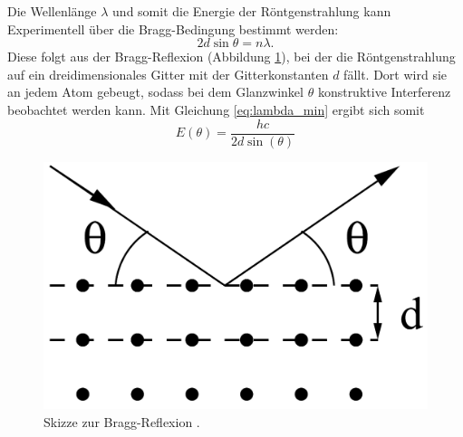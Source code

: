 \noindent Die Wellenlänge $\lambda$ und somit die Energie der Röntgenstrahlung kann Experimentell über die Bragg-Bedingung bestimmt werden:
\begin{equation}
2d\sin\theta = n\lambda\text{.}\label{eq:Bragg}
\end{equation}
Diese folgt aus der Bragg-Reflexion (Abbildung \ref{fig:Bragg}), bei der die Röntgenstrahlung auf ein dreidimensionales Gitter mit der Gitterkonstanten $d$ fällt. Dort wird sie an jedem Atom gebeugt, sodass bei dem Glanzwinkel $\theta$ konstruktive Interferenz beobachtet werden kann.
Mit Gleichung \ref{eq:lambda_min} ergibt sich somit
\begin{equation}
E(\theta)=\frac{hc}{2d\sin{(\theta)}}\label{eq:E}
\end{equation}
\begin{figure}
\centering
\includegraphics[scale=0.2]{content/images/BraggReflexion.png}
\caption{Skizze zur Bragg-Reflexion \cite{V602}.}
\label{fig:Bragg}
\end{figure}